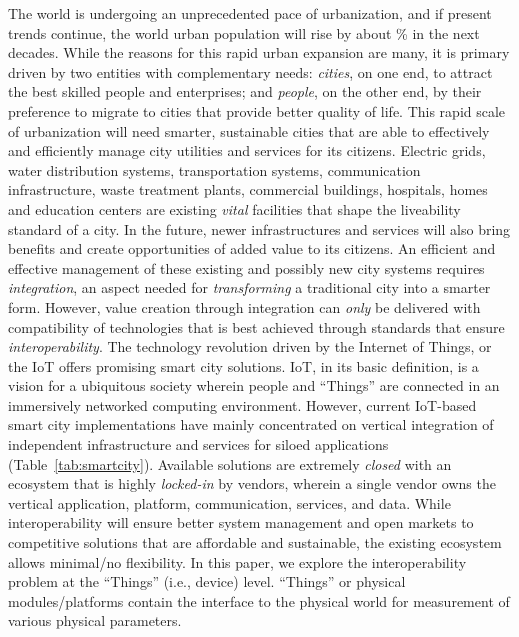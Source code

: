 \documentclass[conference]{IEEEtran}
\begin{document}
The world is undergoing an unprecedented pace of urbanization, and if present trends continue, the world urban population will rise by about \% in the next  decades.
While the reasons for this rapid urban expansion are many, it is primary driven by two entities with complementary needs: \emph{cities}, on one end, to attract the best skilled people and enterprises; and \emph{people}, on the other end, by their preference to migrate to cities that provide better quality of life. 
This rapid scale of urbanization will need smarter, sustainable cities that are able to effectively and efficiently manage city utilities and services for its citizens.
\newline
\indent
Electric grids, water distribution systems, transportation systems, communication infrastructure, waste treatment plants, commercial buildings, hospitals, homes and education centers are existing \emph{vital} facilities that shape the liveability standard of a city. 
In the future, newer infrastructures and services will also bring benefits and create opportunities of added value to its citizens.
An efficient and effective management of these existing and possibly new city systems requires \emph{integration}, an aspect needed for \emph{transforming} a traditional city into a smarter form. 
However, value creation through integration can \emph{only} be delivered with compatibility of technologies that is best achieved through standards that ensure \emph{interoperability}.
\newline
\indent
The technology revolution driven by the Internet of Things, or the IoT offers promising smart city solutions.
IoT, in its basic definition, is a vision for a ubiquitous society wherein people and ``Things'' are connected in an immersively networked computing environment.
However, current IoT-based smart city implementations have mainly concentrated on vertical integration of independent infrastructure and services for siloed applications (Table~\ref{tab:smartcity}).
Available solutions are extremely \emph{closed} with an ecosystem that is highly \emph{locked-in} by vendors, wherein a single vendor owns the vertical application, platform, communication, services, and data.
While interoperability will ensure better system management and open markets to competitive solutions that are affordable and sustainable, the existing ecosystem allows minimal/no flexibility.\newline
\indent
In this paper, we explore the interoperability problem at the ``Things'' (i.e., device) level.
``Things'' or physical modules/platforms contain the interface to the physical world for measurement of various physical parameters.
\end{document}
